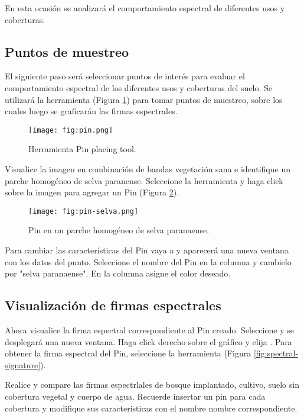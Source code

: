 En esta ocasión se analizará el comportamiento espectral de diferentes usos y coberturas.

\subsection{Puntos de muestreo}

El siguiente paso será seleccionar puntos de interés para evaluar el comportamiento espectral de los diferentes usos y coberturas del suelo. Se utilizará la herramienta  (Figura \ref{fig:pin}) para tomar puntos de muestreo, sobre los cuales luego se graficarán las firmas espectrales.

\begin{figure}[h!]
    \centering
    \texttt{[image: fig:pin.png]}
    \caption{Herramienta Pin placing tool.}
    \label{fig:pin}
\end{figure}

Visualice la imagen en combinación de bandas vegetación sana e identifique un parche homogéneo de selva paranense. Seleccione la herramienta  y haga click sobre la imagen para agregar un Pin (Figura \ref{fig:selva}).

\begin{figure}[h!]
    \centering
    \texttt{[image: fig:pin-selva.png]}
    \caption{Pin en un parche homogéneo de selva paranaense.}
    \label{fig:selva}
\end{figure}

Para cambiar las características del Pin vaya a  y aparecerá una nueva ventana con los datos del punto. Seleccione el nombre del Pin en la columna  y cambielo por "selva paranaense". En la columna  asigne el color deseado.

\subsection{Visualización de firmas espectrales}

Ahora visualice la firma espectral correspondiente al Pin creado. Seleccione  y se desplegará una nueva ventana. Haga click derecho sobre el gráfico y elija . Para obtener la firma espectral del Pin, seleccione la herramienta  (Figura \ref{fig:spectral-signature}).


Realice y compare las firmas espectrlales de bosque implantado, cultivo, suelo sin cobertura vegetal y cuerpo de agua. Recuerde insertar un pin para cada cobertura y modifique sus caracteristicas con el nombre nombre correspondiente.

